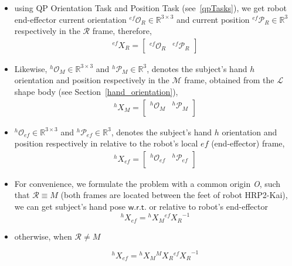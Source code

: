 \begin{itemize}
	\item using QP Orientation Task and Position Task (see~\ref{qpTasks}), we get robot end-effector current orientation ${{}^{ef}\mathcal{O}_R} \in \mathbb{R}^{3\times3}$ and current position ${{}^{ef}\mathcal{P}_R} \in \mathbb{R}^{3}$ respectively in the $\mathcal{R}$ frame, therefore,
	\begin{gather}\label{X_R_ef}
		{}^{ef}{X}_R =
		\left[\begin{array}{cc}
		{}^{ef}\mathcal{O}_R & {}^{ef}\mathcal{P}_R
		\end{array}\right]
	\end{gather}
	
	\item Likewise, ${{}^{h}\mathcal{O}_M} \in \mathbb{R}^{3\times3}$ and ${{}^{h}\mathcal{P}_M} \in \mathbb{R}^{3}$, denotes the subject's hand $h$ orientation and position respectively in the $\mathcal{M}$ frame, obtained from the $\mathcal{L}$ shape body (see Section~\ref{hand_orientation}),
	\begin{gather}\label{X_M_h}
		{}^{h}{X}_M =
		\left[\begin{array}{cc}
		{}^{h}\mathcal{O}_M & {}^{h}\mathcal{P}_M \\
		\end{array}\right]
	\end{gather}

	\item ${{}^{h}\mathcal{O}_{ef}} \in \mathbb{R}^{3\times3}$ and ${{}^{h}\mathcal{P}_{ef}} \in \mathbb{R}^{3}$, denotes the subject's hand $h$ orientation and position respectively in relative to the robot's local $ef$ (end-effector) frame,
	\begin{gather}\label{X_ef_h}
		{}^{h}{X}_{ef} =
		\left[\begin{array}{cc}
		{}^{h}\mathcal{O}_{ef} & {}^{h}\mathcal{P}_{ef} \\
		\end{array}\right]
	\end{gather}
	
	\item For convenience, we formulate the problem with a common origin {\it O}, such that $\mathcal R \equiv M$ (both frames are located between the feet of robot HRP2-Kai), we can get subject's hand pose $\mathsf{w.r.t.}$ or relative to robot's end-effector
%	
	\begin{equation}\label{X_ef_h1}
		{}^{h}{X}_{ef} = {}^{h}{X}_{M}  {}^{ef}{X_{R}}^{-1}
	\end{equation}
	\item otherwise, when $\mathcal R \neq M$

	\begin{equation}\label{X_ef_h2}
	{}^{h}{X}_{ef} = {}^{h}{X}_{M}  {}^{M}{X}_R  {}^{ef}{X_{R}}^{-1}
	\end{equation}
	
\end{itemize}




